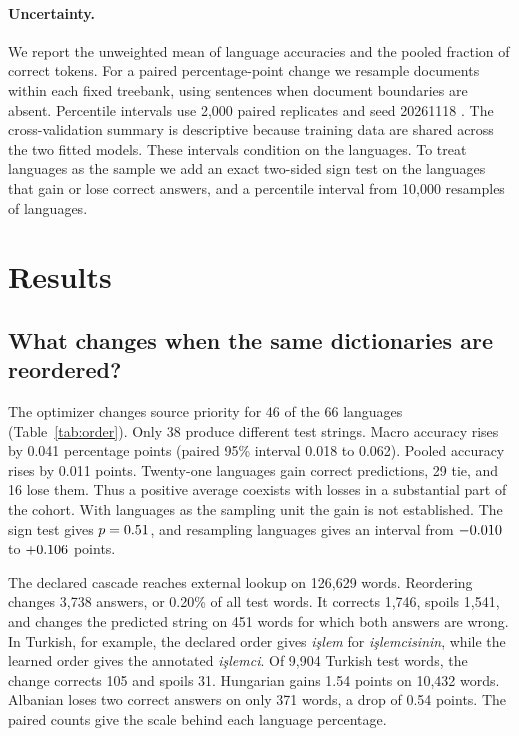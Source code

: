 \documentclass[11pt]{article}
\begin{document}
\paragraph{Uncertainty.}
We report the unweighted mean of language accuracies and the pooled fraction
of correct tokens. For a paired percentage-point change we resample documents
within each fixed treebank, using sentences when document boundaries are
absent. Percentile intervals use 2,000 paired replicates and seed 20261118
\citep{berg-kirkpatrick-etal-2012-empirical,dror-etal-2018-hitchhikers}. The
cross-validation summary is descriptive
because training data are shared across the two fitted models. These
intervals condition on the languages. To treat languages as the sample we
add an exact two-sided sign test on the languages that gain or lose correct
answers, and a percentile interval from 10,000 resamples of languages.

\section{Results}
\label{sec:results}

\subsection{What changes when the same dictionaries are reordered?}

\begin{table}[t]
\centering\small

\caption{Official UD 2.19 train/test splits. Each policy is scored on the
same 1,870,881 words in 66 languages. Accuracies are percentages and
$\Delta$ is the paired difference from declared order in percentage points.}
\label{tab:order}
\end{table}

The optimizer changes source priority for 46 of the 66 languages
(Table~\ref{tab:order}). Only 38 produce different test strings.
Macro accuracy rises by 0.041 percentage points (paired 95\% interval
0.018 to 0.062). Pooled accuracy rises by 0.011 points. Twenty-one languages
gain correct predictions, 29 tie, and 16 lose them. Thus a positive average
coexists with losses in a substantial part of the cohort. With languages as
the sampling unit the gain is not established. The sign test gives
\(p=0.51\), and resampling languages gives an interval from
\(-0.010\) to \(+0.106\) points.

The declared cascade reaches external lookup on 126,629 words. Reordering
changes 3,738 answers, or 0.20\% of all test words. It corrects 1,746,
spoils 1,541, and changes the predicted string on 451 words for which both
answers are wrong. In Turkish, for example, the declared order gives
\emph{i\c{s}lem} for \emph{i\c{s}lemcisinin}, while the learned order gives the
annotated \emph{i\c{s}lemci}. Of 9,904 Turkish test words, the change corrects
105 and spoils 31. Hungarian gains 1.54 points on 10,432 words. Albanian
loses two correct answers on only 371 words, a drop of 0.54 points.
The paired counts give the scale behind each language percentage.
\end{document}
